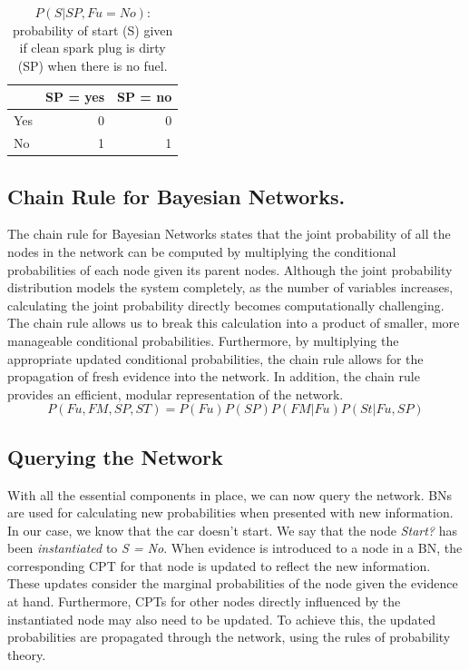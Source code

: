 \documentclass[twocol]{ametsoc}
\begin{document}
\begin{table}

\caption{\label{tab:toy_table}$P(S|SP, Fu = No)$: probability of start (S) given if clean spark plug is dirty (SP) when there is no fuel.}
\centering
\begin{tabular}[t]{l|r|r}
\hline
  & SP = yes & SP = no\\
\hline
Yes & 0 & 0\\
\hline
No & 1 & 1\\
\hline
\end{tabular}
\end{table}

\hypertarget{chain-rule-for-bayesian-networks.}{%
\subsection{Chain Rule for Bayesian
Networks.}\label{chain-rule-for-bayesian-networks.}}

The chain rule for Bayesian Networks states that the joint probability
of all the nodes in the network can be computed by multiplying the
conditional probabilities of each node given its parent nodes. Although
the joint probability distribution models the system completely, as the
number of variables increases, calculating the joint probability
directly becomes computationally challenging. The chain rule allows us
to break this calculation into a product of smaller, more manageable
conditional probabilities. Furthermore, by multiplying the appropriate
updated conditional probabilities, the chain rule allows for the
propagation of fresh evidence into the network. In addition, the chain
rule provides an efficient, modular representation of the network. \[
P(Fu, FM, SP, ST) = P(Fu)P(SP)P(FM|Fu)P(St|Fu, SP)
\]

\hypertarget{querying-the-network}{%
\subsection{Querying the Network}\label{querying-the-network}}

With all the essential components in place, we can now query the
network. BNs are used for calculating new probabilities when presented
with new information. In our case, we know that the car doesn't start.
We say that the node \emph{Start?} has been \emph{instantiated} to
\emph{S = No}. When evidence is introduced to a node in a BN, the
corresponding CPT for that node is updated to reflect the new
information. These updates consider the marginal probabilities of the
node given the evidence at hand. Furthermore, CPTs for other nodes
directly influenced by the instantiated node may also need to be
updated. To achieve this, the updated probabilities are propagated
through the network, using the rules of probability theory.
\end{document}
